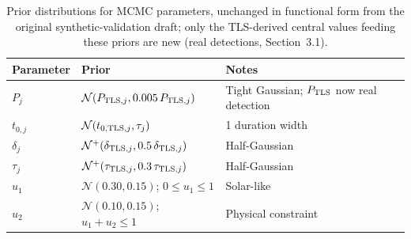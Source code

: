 \documentclass[11pt]{article}
\begin{document}
\begin{table}[h]
\centering
\caption{Prior distributions for MCMC parameters, unchanged in functional form from the original synthetic-validation draft; only the TLS-derived central values feeding these priors are new (real detections, Section~3.1).}
\begin{tabular}{lll}
\toprule
Parameter & Prior & Notes \\
\midrule
$P_j$ & $\mathcal N(P_{{\rm TLS},j}, 0.005\,P_{{\rm TLS},j})$ & Tight Gaussian; $P_{\rm TLS}$ now real detection \\
$t_{0,j}$ & $\mathcal N(t_{0,{\rm TLS},j}, \tau_j)$ & 1 duration width \\
$\delta_j$ & $\mathcal N^+(\delta_{{\rm TLS},j}, 0.5\,\delta_{{\rm TLS},j})$ & Half-Gaussian \\
$\tau_j$ & $\mathcal N^+(\tau_{{\rm TLS},j}, 0.3\,\tau_{{\rm TLS},j})$ & Half-Gaussian \\
$u_1$ & $\mathcal N(0.30,0.15)$; $0\le u_1\le1$ & Solar-like \\
$u_2$ & $\mathcal N(0.10,0.15)$; $u_1+u_2\le1$ & Physical constraint \\
\bottomrule
\end{tabular}
\end{table}
\end{document}
